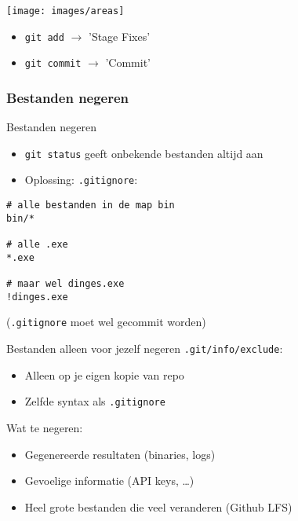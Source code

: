 \begin{frame}
	\begin{center}
		\texttt{[image: images/areas]}
	\end{center}
	\begin{itemize}
		\item \texttt{git add} $\rightarrow$ 'Stage Fixes'
		\item \texttt{git commit} $\rightarrow$ 'Commit'
	\end{itemize}
\end{frame}

\subsubsection{Bestanden negeren}
\begin{frame}[fragile]{Bestanden negeren}
	\begin{itemize}
		\item \texttt{git status} geeft onbekende bestanden altijd aan
		\item Oplossing: \texttt{.gitignore}:
	\end{itemize}
	\begin{verbatim}
# alle bestanden in de map bin
bin/*

# alle .exe
*.exe

# maar wel dinges.exe
!dinges.exe
	\end{verbatim}

	(\texttt{.gitignore} moet wel gecommit worden)
\end{frame}

\begin{frame}{Bestanden alleen voor jezelf negeren}
	\texttt{.git/info/exclude}:
	\begin{itemize}
		\item Alleen op je eigen kopie van repo
		\item Zelfde syntax als \texttt{.gitignore}
	\end{itemize}

	Wat te negeren:
	\begin{itemize}
		\item Gegenereerde resultaten (binaries, logs)
		\item Gevoelige informatie (API keys, \ldots)
		\item Heel grote bestanden die veel veranderen (Github LFS)
	\end{itemize}
\end{frame}

